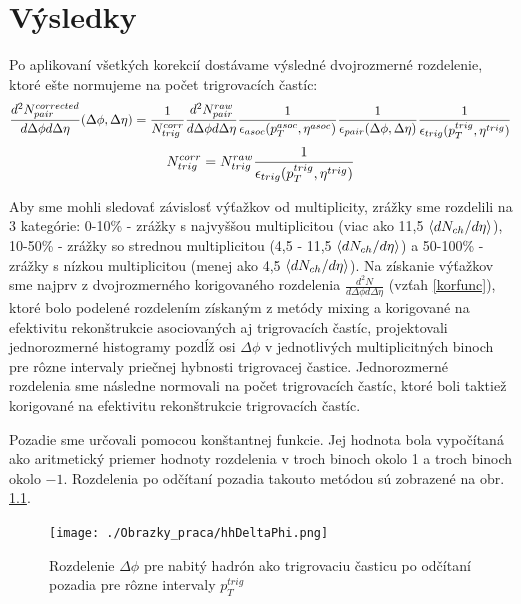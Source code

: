 \documentclass[thesismargins, thesislinespacing]{rnthesis}
\begin{document}
\chapter{Výsledky}
 Po aplikovaní všetkých korekcií dostávame výsledné dvojrozmerné rozdelenie, ktoré ešte normujeme na počet trigrovacích častíc:
\begin{equation}
\footnotesize
\frac{d^2N^{corrected}_{pair}}{d\Delta\phi d\Delta\eta}(\Delta\phi,\Delta \eta)=
\frac{1}{N^{corr}_{trig}} \frac{d^2N^{raw}_{pair}}{d\Delta\phi d\Delta\eta} \frac{1}{\epsilon_{asoc}(p_{T}^{asoc},\eta^{asoc})}\frac{1}{\epsilon_{pair}(\Delta\phi,\Delta\eta)}
\frac{1}{\epsilon_{trig}(p_{T}^{trig},\eta^{trig})}
\label{korfunc}
\end{equation}
\begin{equation}
\footnotesize
N^{corr}_{trig}=N^{raw}_{trig}\frac{1}{\epsilon_{trig}(p_{T}^{trig},\eta^{trig})}
\end{equation}

Aby sme mohli sledovať závislosť výťažkov od multiplicity, zrážky sme rozdelili na 3 kategórie: 0-10\% - zrážky s najvyššou multiplicitou (viac ako 11,5 $\braket{dN_{ch}/d\eta}$), 10-50\% - zrážky so strednou multiplicitou (4,5 - 11,5 $\braket{dN_{ch}/d\eta}$) a 50-100\% - zrážky s nízkou multiplicitou (menej ako 4,5 $\braket{dN_{ch}/d\eta}$).
Na získanie výťažkov sme najprv z dvojrozmerného korigovaného rozdelenia $\frac{d^2N}{d\Delta \phi d\Delta \eta}$ (vzťah \ref{korfunc}), ktoré bolo podelené rozdelením získaným z metódy mixing a korigované na efektivitu rekonštrukcie asociovaných aj trigrovacích častíc, projektovali jednorozmerné histogra\-my pozdĺž osi $\Delta\phi$ v jednotlivých multiplicitných binoch pre rôzne intervaly priečnej hybnosti trigrovacej častice. Jednorozmerné rozdelenia sme následne normovali na počet trigrovacích častíc, ktoré boli taktiež korigované na efektivitu rekonštrukcie trigrovacích častíc. 

Pozadie sme určovali pomocou konštantnej funkcie. Jej hodnota bola vypočítaná ako aritmetický priemer hodnoty rozdelenia v troch binoch okolo 1 a troch binoch okolo $-1$. Rozdelenia po odčítaní pozadia takouto metódou sú zobrazené na obr. \ref{dphi}.

\begin{figure}
	\centering
	\texttt{[image: ./Obrazky\_praca/hhDeltaPhi.png]}
	\caption{Rozdelenie $\Delta \phi$ pre nabitý hadrón ako trigrovaciu časticu po odčítaní pozadia pre rôzne intervaly $p_T^{trig}$}
	\label{dphi}
\end{figure}
\end{document}
